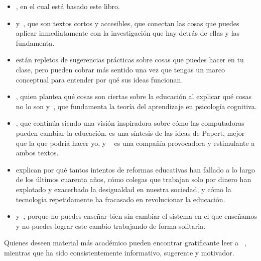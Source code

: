 \begin{itemize}

\item
 ,
 en el cual está basado este libro. 
\item
 \cite{Lang2016} y~\cite{Hust2012}, que son textos cortos y accesibles, que conectan las cosas que puedes aplicar 
 inmediatamente con la investigación que hay detrás de ellas y las fundamenta. 

\item
 \cite{Berg2012,Lemo2014,Majo2015,Broo2016,Rice2018,Wein2018b}
 están repletos de sugerencias prácticas sobre cosas que puedes hacer en tu clase,
pero pueden cobrar más sentido una vez que tengas un marco conceptual para entender por qué sus ideas funcionan. 

\item
 \cite{DeBr2015},
 quien plantea qué cosas son ciertas sobre la educación al explicar qué cosas no lo son y~\cite{Dida2016},
 que fundamenta la teoría del aprendizaje en psicología cognitiva. 

\item
 \cite{Pape1993},
 que continúa siendo una visión inspiradora sobre cómo las computadoras pueden cambiar la educación.
 es una síntesis de las ideas de Papert, mejor que la que podría hacer yo, y ~\cite{Craw2010} es una compañía provocadora y estimulante a ambos textos.

\item
 \cite{Gree2014,McMi2017,Watt2014} explican por qué tantos intentos de reformas educativas 
 han fallado a lo largo de los últimos cuarenta años, cómo colegas que trabajan solo por dinero han explotado 
 y exacerbado la desigualdad en nuestra sociedad, y cómo la tecnología repetidamente ha fracasado en revolucionar la educación. 

\item
 \cite{Brow2007} y~\cite{Mann2015},
 porque no puedes enseñar bien sin cambiar el sistema en el que enseñamos
y no puedes lograr este cambio trabajando de forma solitaria.

\end{itemize}

Quienes deseen material más académico pueden encontrar gratificante leer a ~\cite{Guzd2015a,Hazz2014,Sent2018,Finc2019,Hpl2018},
mientras que  ha sido consistentemente informativo, sugerente y motivador.

